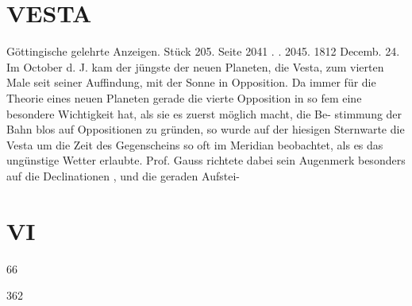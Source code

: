 \documentclass[12pt,a4paper]{article}
\begin{document}
\section*{VESTA}
Göttingische  gelehrte  Anzeigen.     Stück  205.  Seite  2041  . .  2045.     1812  Decemb.  24. 
Im  October  d.  J.  kam  der  jüngste  der  neuen  Planeten,  die  Vesta,  zum  vierten  Male  seit  seiner 
Auffindung,  mit  der  Sonne  in  Opposition.  Da  immer  für  die  Theorie  eines  neuen  Planeten  gerade  die 
vierte  Opposition  in  so  fem  eine  besondere  Wichtigkeit  hat,  als  sie  es  zuerst  möglich  macht,  die  Be- 
stimmung der  Bahn  blos  auf  Oppositionen  zu  gründen,  so  wurde  auf  der  hiesigen  Sternwarte  die  Vesta 
um  die  Zeit  des  Gegenscheins  so  oft  im  Meridian  beobachtet,  als  es  das  ungünstige  Wetter  erlaubte. 
Prof.  Gauss  richtete  dabei  sein  Augenmerk  besonders  auf  die  Declinationen ,    und  die  geraden  Aufstei- 

\section*{VI}
66 


\newpage
362 
\end{document}
